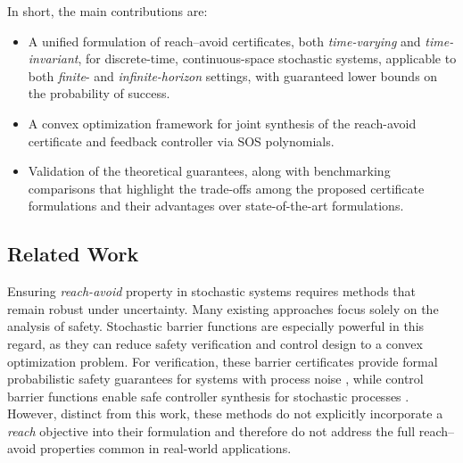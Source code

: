 \documentclass[journal,twoside,web]{ieeecolor}
\theoremstyle{definition}
\theoremstyle{plain}
\theoremstyle{plain}
\begin{document}
In short, the main contributions are:
\begin{itemize}
    \item A unified formulation of reach–avoid certificates, both \emph{time-varying} and \emph{time-invariant}, for discrete-time, continuous-space stochastic systems, applicable to both \emph{finite}- and \emph{infinite-horizon} settings, with guaranteed lower bounds on the probability of success.
     \item A convex optimization framework for joint synthesis of the reach-avoid certificate and feedback controller via SOS polynomials.
    \item Validation of the theoretical guarantees,
    along with benchmarking comparisons that highlight the trade-offs among the proposed certificate formulations and their advantages over state-of-the-art formulations.
\end{itemize}



\subsection*{Related Work}
Ensuring \emph{reach-avoid} property in stochastic systems requires methods that remain robust under uncertainty. Many existing approaches focus solely on the analysis of safety. Stochastic barrier functions are especially powerful in this regard, as they can reduce safety verification and control design to a convex optimization problem. For verification, these barrier certificates provide formal probabilistic safety guarantees for systems with process noise \cite{SANTOYO2021109439, mazouz2022safety, mazouz2024piecewise}, while control barrier functions enable safe controller synthesis for stochastic processes \cite{mazouz2024data, jagtap2020formal,  vahs2023belief, mazouz2025piecewise}. However, distinct from this work, these methods do not explicitly incorporate a \emph{reach} objective into their formulation and therefore do not address the full reach–avoid properties common in real-world applications.
\end{document}
